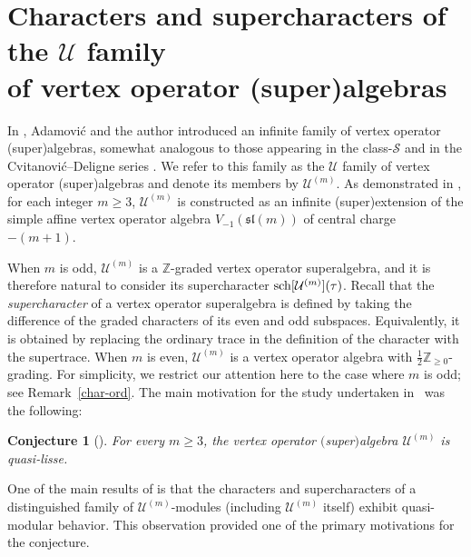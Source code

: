\documentclass[pdftex]{sigma}
\numberwithin{equation}{section}
\newtheorem{Conjecture}[Theorem]{Conjecture}
\theoremstyle{definition}
\begin{document}
\section[Characters and supercharacters of the U family of vertex operator (super)algebras]{Characters and supercharacters of the $\boldsymbol{\mathcal{U}}$ family\\ of vertex operator (super)algebras}\label{section4}

In \cite{AM}, Adamovi\'c and the author introduced an infinite family of vertex operator (super)algebras, somewhat analogous to those appearing in the class-$\mathcal{S}$ and in the Cvitanovi\'c--Deligne series \cite{AK,BR}.
We refer to this family as the $\mathcal{U}$ family of vertex operator (super)algebras and denote its members by $\mathcal{U}^{(m)}$. As demonstrated in \cite{AM},
for each integer $m \geq 3$, $\mathcal{U}^{(m)}$ is constructed as an infinite (super)extension of the simple affine vertex operator algebra $V_{-1}(\mathfrak{sl}(m))$ of central charge $-(m+1)$.

When $m$ is odd, $\mathcal{U}^{(m)}$ is a $\mathbb{Z}$-graded vertex operator superalgebra, and it is therefore natural to consider its supercharacter ${\rm sch}[\mathcal{U}^{(m)}](\tau)$.
Recall that the \emph{supercharacter} of a vertex operator superalgebra is
defined by taking the difference of the graded characters of its even and odd
subspaces. Equivalently, it is obtained by replacing the ordinary trace in the
definition of the character with the supertrace.
When $m$ is even, $\mathcal{U}^{(m)}$ is a vertex operator algebra with $\tfrac{1}{2}\mathbb{Z}_{\geq 0}$-grading.
For simplicity, we restrict our attention here to the case where $m$ is odd; see Remark~\ref{char-ord}.
The main motivation for the study undertaken in~\cite{AM} was the following:

\begin{Conjecture}[\cite{AM}] For every $m \geq 3$, the vertex operator $($super$)$algebra $\mathcal{U}^{(m)}$ is quasi-lisse.
\end{Conjecture}

One of the main results of \cite{AM} is that the characters and supercharacters of a distinguished family of $\mathcal{U}^{(m)}$-modules (including $\mathcal{U}^{(m)}$ itself) exhibit quasi-modular behavior.
This observation provided one of the primary motivations for the conjecture.
\end{document}
